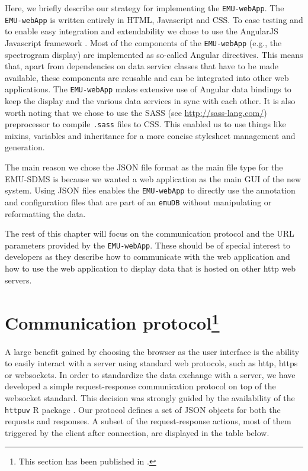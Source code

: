 \documentclass[
]{book}
\begin{document}
Here, we briefly describe our strategy for implementing the \texttt{EMU-webApp}. The \texttt{EMU-webApp} is written entirely in HTML, Javascript and CSS. To ease testing and to enable easy integration and extendability we chose to use the AngularJS Javascript framework \citep{google:2014a}. Most of the components of the \texttt{EMU-webApp} (e.g., the spectrogram display) are implemented as so-called Angular directives. This means that, apart from dependencies on data service classes that have to be made available, these components are reusable and can be integrated into other web applications. The \texttt{EMU-webApp} makes extensive use of Angular data bindings to keep the display and the various data services in sync with each other. It is also worth noting that we chose to use the SASS (see \url{http://sass-lang.com/}) preprocessor to compile \texttt{.sass} files to CSS. This enabled us to use things like mixins, variables and inheritance for a more concise stylesheet management and generation.

The main reason we chose the JSON file format as the main file type for the EMU-SDMS is because we wanted a web application as the main GUI of the new system. Using JSON files enables the \texttt{EMU-webApp} to directly use the annotation and configuration files that are part of an \texttt{emuDB} without manipulating or reformatting the data.

The rest of this chapter will focus on the communication protocol and the URL parameters provided by the \texttt{EMU-webApp}. These should be of special interest to developers as they describe how to communicate with the web application and how to use the web application to display data that is hosted on other http web servers.

\hypertarget{subsec:emu-webAppTheProtocol}{%
\section[Communication protocol]{\texorpdfstring{Communication protocol\footnote{This section has been published in \citet{winkelmann:2015d}.}}{Communication protocol}}\label{subsec:emu-webAppTheProtocol}}

A large benefit gained by choosing the browser as the user interface is the ability to easily interact with a server using standard web protocols, such as http, https or websockets. In order to standardize the data exchange with a server, we have developed a simple request-response communication protocol on top of the websocket standard. This decision was strongly guided by the availability of the \texttt{httpuv} R package \citep{rstudio:2015a}. Our protocol defines a set of JSON objects for both the requests and responses. A subset of the request-response actions, most of them triggered by the client after connection, are displayed in the table below.
\end{document}
